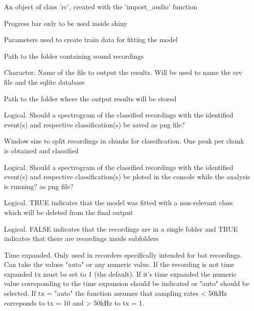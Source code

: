 \documentclass[letterpaper]{book}
\begin{document}
\begin{Arguments}
\begin{ldescription}
\item[\code{model\_path}] An object of class 'rc', created with
the 'import\_audio' function

\item[\code{updateProgress}] Progress bar only to be used inside shiny

\item[\code{metadata}] Parameters used to create train data for fitting the model

\item[\code{file\_path}] Path to the folder containing sound recordings

\item[\code{out\_file}] Character. Name of the file to output the results.
Will be used to name the csv file and the sqlite database

\item[\code{out\_dir}] Path to the folder where the output results will be stored

\item[\code{save\_png}] Logical. Should a spectrogram of the classified recordings
with the identified event(s) and respective classification(s) be saved
as png file?

\item[\code{win\_size}] Window size to split recordings in chunks for classification.
One peak per chunk is obtained and classified

\item[\code{plot2console}] Logical. Should a spectrogram of the classified
recordings with the identified event(s) and respective classification(s)
be ploted in the console while the analysis is running?
as png file?

\item[\code{remove\_noise}] Logical. TRUE indicates that the model was fitted
with a non-relevant class which will be deleted from the final output

\item[\code{recursive}] Logical. FALSE indicates that the recordings are in
a single folder and TRUE indicates that there are recordings
inside subfolders

\item[\code{tx}] Time expanded. Only used in recorders specifically intended for
bat recordings. Can take the values "auto" or any numeric value. If the
recording is not time expanded tx must be set to 1 (the default). If it's
time expanded the numeric value correponding to the time expansion should
be indicated or "auto" should be selected. If tx = "auto" the function
assumes that sampling rates < 50kHz correponds to
tx = 10 and > 50kHz to tx = 1.
\end{ldescription}
\end{Arguments}
\end{document}
